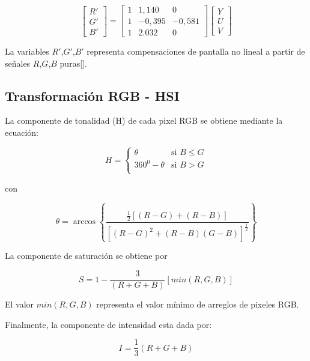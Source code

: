 \begin{equation}
\begin{bmatrix}
R' \\ 
G' \\ 
B'
\end{bmatrix} =
\begin{bmatrix}
1 & 1,140 & 0\\ 
1 & -0,395 & -0,581 \\ 
1 & 2.032 & 0
\end{bmatrix}
\begin{bmatrix}
Y \\ 
U \\ 
V
\end{bmatrix}
\end{equation}

La variables $R'$,$G'$,$B'$ representa compensaciones de pantalla no lineal a partir de señales $R$,$G$,$B$ puras[].


\subsection{Transformación RGB - HSI}

La componente de tonalidad (H) de cada pixel RGB se obtiene mediante la ecuación:

\begin{equation}
H=\left\{
  \begin{array}{ll}
     \theta & \text{si } B \leq G \\
     360^{0} - \theta & \text{si } B > G \\
  \end{array}
  \right.
\end{equation}

con 

\begin{equation}
\theta = \arccos\left\lbrace\frac{\frac{1}{2}[(R-G)+(R-B)]}{[(R-G)^{2}+(R-B)(G-B)]^{\frac{1}{2}}}\right\rbrace
\end{equation}

La componente de saturación se obtiene por 

\begin{equation}
S=1-\frac{3}{(R+G+B)}[min(R,G,B)]
\end{equation}

El valor $min(R,G,B)$ representa el valor mínimo de arreglos de pixeles RGB.

Finalmente, la componente de intensidad esta dada por:

\begin{equation}
I=\frac{1}{3}(R+G+B)
\end{equation}

